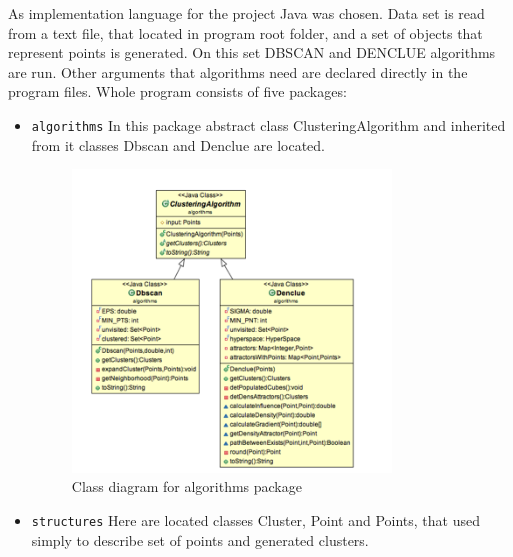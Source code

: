 \documentclass[12pt, a4paper, notitlepage, oneside]{article}
\begin{document}
As implementation language for the project Java was chosen. 
Data set is read from a text file, that located in program root folder, 
and a set of objects that represent points is generated. 
On this set DBSCAN and DENCLUE algorithms are run. 
Other arguments that algorithms need are declared directly in the program files. Whole program consists of five packages:
\begin{itemize}
	\item \texttt{algorithms} In this package abstract class ClusteringAlgorithm and inherited from it classes Dbscan and Denclue are located. 

	\begin{figure}[!ht]
 	\centering
	\includegraphics[width=0.8\textwidth]{images/algorithms_package.png}
 	\caption[]
	{Class diagram for algorithms package}
	\end{figure}

	\item \texttt{structures} Here are located classes Cluster, Point and Points, that used simply to describe set of points and generated clusters. 


\end{itemize}
\end{document}
